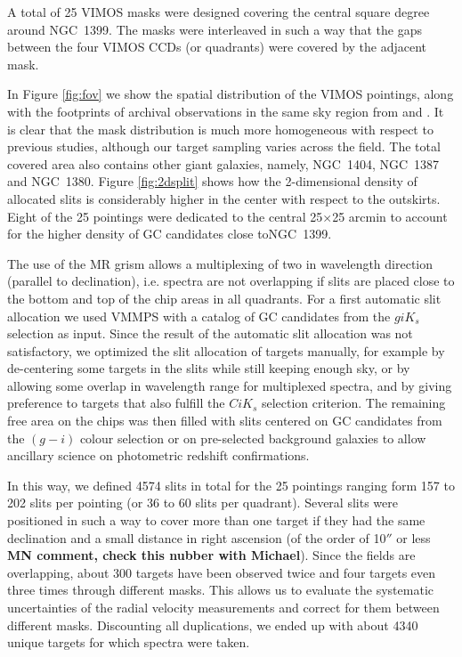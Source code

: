 \documentclass[useAMS,usenatbib]{mn2e}
\begin{document}
A total of 25 VIMOS masks were designed covering the central square degree 
around NGC~1399. The masks were interleaved in such a way that the gaps between 
the four VIMOS CCDs (or quadrants) were covered by the adjacent mask. 

In Figure \ref{fig:fov} we show the spatial distribution of the VIMOS 
pointings, along with the footprints of archival observations in the same sky 
region from \citet{Schuberth} and \citet{Bergond07}. It is clear that the mask 
distribution is much more homogeneous with respect to previous studies, 
although our target sampling varies across the field. The total covered area 
also contains other giant galaxies, namely, NGC~1404, NGC~1387 and NGC~1380.  
Figure \ref{fig:2dsplit} shows how the 2-dimensional density of allocated slits 
is considerably higher in the center with respect to the outskirts. Eight of 
the 25 pointings were dedicated to the central 25$\times$25 arcmin to account 
for the higher density of GC candidates close toNGC~1399. 

The use of the MR grism allows a multiplexing of two in wavelength direction 
(parallel to declination), i.e. spectra are not overlapping if slits are placed 
close to the bottom and top of the chip areas in all quadrants. 
For a first automatic slit allocation we used VMMPS with a catalog of GC 
candidates from the $giK_s$ selection as input. Since the result of the 
automatic slit allocation was not satisfactory, we optimized the slit 
allocation of targets manually, for example by de-centering some targets in the 
slits while still keeping enough sky, or by allowing some overlap in wavelength 
range for multiplexed spectra, and by giving preference to targets that also 
fulfill the $CiK_s$ selection criterion. The remaining free area on the chips 
was then filled with slits centered on GC candidates from the $(g-i)$ colour 
selection or on pre-selected background galaxies to allow ancillary science on 
photometric redshift confirmations.

In this way, we defined 4574 slits in total for the 25 pointings ranging form 
157 to 202 slits per pointing (or 36 to 60 slits per quadrant). Several slits 
were positioned in such a way to cover more than one target if they had the 
same declination and a small distance in right ascension (of the order of 
10$''$ or less {\bf MN comment, check this nubber with Michael}). Since the 
fields are overlapping, about 300 targets have been observed twice and four 
targets even three times through different masks. This allows us to evaluate 
the systematic uncertainties of the radial velocity measurements and correct 
for them between different masks. Discounting all duplications, we ended up 
with about 4340 unique targets
for which spectra were taken. 
\end{document}
